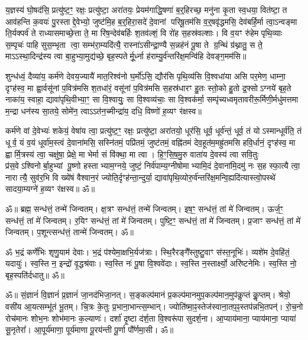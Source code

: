 य॒ज्ञस्य॑ घो॒षद॑सि॒ प्रत्यु॑ष्ट॒ꣳ॒ रक्षः॒ प्रत्यु॑ष्टा॒ अरा॑तयः॒ प्रेयम॑गाद्धि॒षणा॑ ब॒र्॒हिरच्छ॒
मनु॑ना कृ॒ता स्व॒धया॒ वित॑ष्टा॒ त आव॑हन्ति क॒वयः॑ पु॒रस्ताद्दे॒वेभ्यो॒ जुष्ट॑मि॒ह ब॒र्॒हिरा॒सदे॑
दे॒वानां परिषू॒तम॑सि व॒र्॒षवृ॑द्धमसि॒ देव॑बर्हि॒र्मा त्वा॒ऽन्वङ्मा ति॒र्यक्पर्व॑ ते
राध्यासमाच्छे॒त्ता ते॒ मा रि॑ष॒न्देव॑बर्हिः श॒तव॑ल्शं॒ वि रो॑ह स॒हस्र॑वल्शाः। वि व॒यꣳ
रु॑हेम पृथि॒व्याः स॒म्पृचः॑ पाहि सुस॒म्भृता त्वा॒ सम्भ॑रा॒म्यदि॑त्यै॒ रास्ना॑ऽसीन्द्रा॒ण्यै
स॒न्नह॑नं पू॒षा ते ग्र॒न्थिं ग्र॑थ्नातु॒ स ते॒ माऽऽस्था॒दिन्द्र॑स्य त्वा बा॒हुभ्या॒मुद्य॑च्छे॒
बृह॒स्पतेर्मू॒र्ध्ना ह॑राम्यु॒र्व॑न्तरि॑क्ष॒मन्वि॑हि देवङ्ग॒मम॑सि॥

शुन्ध॑ध्वं॒ दैव्या॑य॒ कर्म॑णे देवय॒ज्यायै॑ मात॒रिश्व॑नो घ॒र्मो॑ऽसि॒ द्यौर॑सि पृथि॒व्य॑सि वि॒श्वधा॑या
असि पर॒मेण॒ धाम्ना॒ दृꣳह॑स्व॒ मा ह्वा॒र्वसू॑नां प॒वित्र॑मसि श॒तधा॑रं॒ वसू॑नां प॒वित्र॑मसि
स॒हस्र॑धारꣳ हु॒तः स्तो॒को हु॒तो द्र॒फ्सोऽग्नये॑ बृह॒ते नाका॑य॒ स्वाहा॒ द्यावा॑पृथि॒वीभ्या॒ꣳ॒ सा
वि॒श्वायुः॒ सा वि॒श्वव्य॑चाः॒ सा वि॒श्वक॑र्मा॒ सम्पृ॑च्यध्वमृतावरीरू॒र्मिणी॒र्मधु॑मत्तमा म॒न्द्रा
धन॑स्य सा॒तये॒ सोमे॑न॒ त्वाऽऽत॑न॒च्मीन्द्रा॑य॒ दधि॒ विष्णो॑ ह॒व्यꣳ र॑क्षस्व॥ 

कर्म॑णे वां दे॒वेभ्यः॑ शकेयं॒ वेषा॑य त्वा॒ प्रत्यु॑ष्ट॒ꣳ॒ रक्षः॒ प्रत्यु॑ष्टा॒ अरा॑तयो॒ धूर॑सि॒
धूर्व॒ धूर्व॑न्तं॒ धूर्व॒ तं योऽस्मान्धूर्व॑ति॒ तं धूर्व॒ यं व॒यं धूर्वा॑म॒स्त्वं दे॒वाना॑मसि॒
सस्नि॑तमं॒ पप्रि॑तमं॒ जुष्ट॑तमं॒ वह्नि॑तमं देव॒हूत॑म॒मह्रु॑तमसि हवि॒र्धानं॒ दृꣳह॑स्व॒ मा
ह्वार्मि॒त्रस्य॑ त्वा॒ चक्षु॑षा॒ प्रेक्षे॒ मा भेर्मा सं वि॑क्था॒ मा त्वा।
हि॒ꣳ॒सि॒ष॒मु॒रु वाता॑य दे॒वस्य॑ त्वा सवि॒तुः प्र॑स॒वेऽश्विनोर्बा॒हुभ्यां पू॒ष्णो
हस्ताभ्याम॒ग्नये॒ जुष्टं॒ निर्व॑पाम्य॒ग्नीषोमाभ्यामि॒दं दे॒वाना॑मि॒दमु॑ नः स॒ह स्फा॒त्यै त्वा॒
नारात्यै॒ सुव॑र॒भि वि ख्ये॑षं वैश्वान॒रं ज्योति॒र्दृꣳह॑न्ता॒न्दुर्या॒
द्यावा॑पृथि॒व्योरु॒र्व॑न्तरि॑क्ष॒मन्वि॒ह्यदि॑त्यास्त्वो॒पस्थे॑ सादया॒म्यग्ने॑ ह॒व्यꣳ र॑क्षस्व॥ ॐ॥

ॐ॥ ब्रह्म॒ सन्ध॑त्तं॒ तन्मे॑ जिन्वतम्।
क्ष॒त्रꣳ सन्ध॑त्तं॒ तन्मे॑ जिन्वतम्।
इष॒ꣳ॒ सन्ध॑त्तं॒ तां मे॑ जिन्वतम्।
ऊर्ज॒ꣳ॒ सन्ध॑त्तं॒ तां मे॑ जिन्वतम्।
र॒यिꣳ सन्ध॑त्तं॒ तां मे॑ जिन्वतम्।
पुष्टि॒ꣳ॒ सन्ध॑त्तं॒ तां मे॑ जिन्वतम्।
प्र॒जाꣳ सन्ध॑त्तं॒ तां मे॑ जिन्वतम्।
प॒शून्त्सन्ध॑त्तं॒ तान्मे॑ जिन्वतम्। ॐ॥

ॐ भ॒द्रं कर्णे॑भिः शृणु॒याम॑ देवाः। भ॒द्रं प॑श्येमा॒क्षभि॒र्यज॑त्राः। 
स्थि॒रैरङ्गै᳚स्तुष्टु॒वाꣳ स॑स्त॒नूभिः॑। व्यशे॑म दे॒वहि॑तं॒ यदायुः॑। 
स्व॒स्ति न॒ इन्द्रो॑ वृ॒द्धश्र॑वाः। स्व॒स्ति नः॑ पू॒षा वि॒श्ववे॑दाः। 
स्व॒स्ति न॒स्तार्क्ष्यो॒ अरि॑ष्टनेमिः। स्व॒स्ति नो॒ बृह॒स्पति॑र्दधातु॥ ॐ॥

ॐ॥ सं॒ज्ञानं॑ वि॒ज्ञानं॑ प्र॒ज्ञानं॑ जा॒नद॑भिजा॒नत्।
स॒ङ्कल्प॑मानं प्र॒कल्प॑मानमुप॒\-कल्प॑मान॒मुप॑कॢप्तं कॢ॒प्तम्।
श्रेयो॒ वसी॑य आ॒यत्सम्भू॑तं भू॒तम्।
चि॒त्रः के॒तुः प्र॒भाना॒भान्त्स॒म्भान्।
ज्योति॑ष्मा॒ꣴ॒स्तेज॑स्वाना॒तप॒ꣴ॒\-स्तप॑न्नभि॒\-तपन्॑।
रो॒च॒नो रोच॑मानः शोभ॒नः शोभ॑मानः क॒ल्याणः॑।
दर्\mbox{}शा॑ दृ॒ष्टा द॑र्\mbox{}श॒ता वि॒श्वरू॑पा सुदर्\mbox{}श॒ना।
आ॒प्याय॑माना॒ प्याय॑माना॒ प्याया॑ सू॒नृतेरा᳚।
आ॒पूर्य॑माणा॒ पूर्य॑माणा पू॒रय॑न्ती पू॒र्णा पौ᳚र्णमा॒सी। ॐ॥

